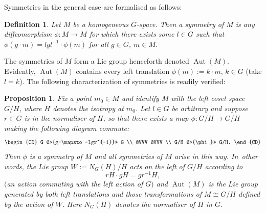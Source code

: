 \documentclass[pdftex]{sigma}%
\numberwithin{equation}{section}
\newtheorem{Proposition}[Theorem]{Proposition}
\newtheorem{Definition}[Theorem]{Definition}
\DeclareMathOperator{\automorphism}{Aut}
\begin{document}
Symmetries in the general case are formalised as follows:
\begin{Definition}\label{symmetriesD}
 Let $M$ be a homogeneous $G$-space. Then a {\it symmetry} of $M$ is
 any diffeomorphism $\phi \colon M \rightarrow M$ for which there
 exists some $l \in G$ such that
 $\phi(g \cdot m) = lgl^{-1} \cdot \phi(m)$ for all
 $g \in G$, $m \in M$.
\end{Definition}

 The symmetries of $M$ form a Lie group henceforth denoted
$\automorphism(M)$. Evidently, $\automorphism(M)$ contains every left
translation $\phi(m):=k \cdot m$, $k \in G$ (take $l=k$). The
following characterization of symmetries is readily verified:

\begin{Proposition}\label{symmetriesP}
 Fix a point $m_0 \in M$ and identify $M$ with the left coset space
 $G/H$, where $H$ denotes the isotropy at $m_0$. Let $l \in G$ be
 arbitrary and suppose $r \in G$ is in the normaliser of $H$, so that
 there exists a map $\phi \colon G/H \rightarrow G/H$ making the
 following diagram commute:
 \begin{equation*}
 \begin{CD} G @>{g~\mapsto~lgr^{-1}}>> G \\ @VVV @VVV \\ G/H
@>{\phi}>> G/H.
 \end{CD}
 \end{equation*}
 Then $\phi $ is a symmetry of $M$ and all
symmetries of $M$ arise in this way. In~other words, the Lie group
$W:=N_G(H)/H$ acts on the left of $G/H$ according to
\[
rH \cdot gH = gr^{-1}H,
\]
$($an action commuting with the left action of $G)$ and
$\automorphism(M)$ is the Lie group generated by both left
translations and those transformations of $M \cong G/H$ defined by the
action of $W$. Here $N_G(H)$ denotes the normaliser of $H $ in $G$.
\end{Proposition}
\end{document}
